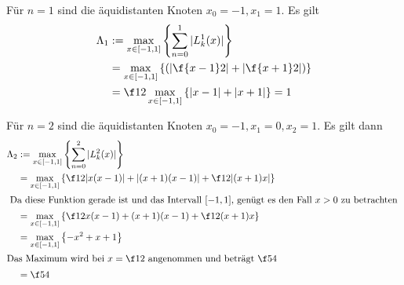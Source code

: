 \documentclass{mywork}
\begin{document}
\begin{aufgabe}~

	Für $n=1$ sind die äquidistanten Knoten $x_0=-1, x_1=1$.
	Es gilt
	\begin{align*}
		\Lambda_1 
		&:= \max_{x\in [-1,1]} \left\{\sum_{n=0}^1 |L_k^{1}(x)| \right\}\\
		&= \max_{x\in [-1,1]} \left\{\left(\left|\f{x-1}2\right| + \left|\f{x+1}2\right|\right)\right\}\\
		&= \f 12 \max_{x\in [-1,1]} \left\{ |x-1| + |x+1|\right\} = 1
	\end{align*}
	
	Für $n=2$ sind die äquidistanten Knoten $x_0=-1,x_1=0,x_2=1$.
	Es gilt dann
	\begin{align*}
		\Lambda_2
		&:= \max_{x\in [-1,1]} \left\{\sum_{n=0}^2 |L_k^{2}(x)|\right\} \\
		&= \max_{x\in [-1,1]} \left\{ \f12 |x(x-1)| + |(x+1)(x-1)| + \f 12 |(x+1)x|\right\} \\
	\intertext{
		Da diese Funktion gerade ist und das Intervall $[-1,1]$, genügt es den Fall $x>0$ zu betrachten
	}
		&= \max_{x\in [-1,1]} \left\{ \f12 x(x-1) + (x+1)(x-1) + \f 12 (x+1)x\right\} \\
		&= \max_{x\in [-1,1]} \left\{ -x^2 +x+1\right\} \\
	\intertext{Das Maximum wird bei $x=\f 12$ angenommen und beträgt $\f 54$}
		&= \f 54
	\end{align*}
\end{aufgabe}
\end{document}
